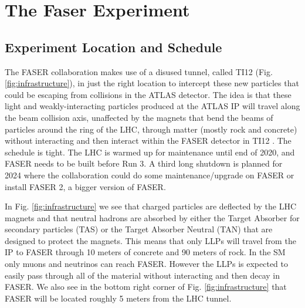 \chapter{The Faser Experiment}

\ifpdf
    \graphicspath{{ChapterFaser/Figs/Raster/}{Chapter3/Figs/PDF/}{Chapter3/Figs/}}
\else
    \graphicspath{{ChapterFaser/Figs/Vector/}{Chapter3/Figs/}}
\fi


\section{Experiment Location and Schedule}


The FASER collaboration makes use of a disused tunnel, called TI12 (Fig. \ref{fig:infrastructure}), in just the right location to intercept these new particles that could be escaping from collisions in the ATLAS detector. The idea is that these light and weakly-interacting particles produced at the ATLAS IP will travel along the beam collision axis, unaffected by the magnets that bend the beams of particles around the ring of the LHC, through matter (mostly rock and concrete) without interacting and then interact within the FASER detector in TI12 \cite{faser_collaboration_faser_2019}. The schedule is tight. The LHC is warmed up for maintenance until end of 2020, and FASER needs to be built before Run 3. A third long shutdown is planned for 2024 where the collaboration could do some maintenance/upgrade on FASER or install FASER 2, a bigger version of FASER.

In Fig. \ref{fig:infrastructure} we see that charged particles are deflected by the LHC magnets and that neutral hadrons are absorbed by either the Target Absorber for secondary particles (TAS) or the Target Absorber Neutral (TAN) that are designed to protect the magnets. This means that only LLPs will travel from the IP to FASER through 10 meters of concrete and 90 meters of rock. In the SM only muons and neutrinos can reach FASER. However the LLPs is expected to easily pass through all of the material without interacting and then decay in FASER. We also see in the bottom right corner of Fig. \ref{fig:infrastructure} that FASER will be located roughly 5 meters from the LHC tunnel.

